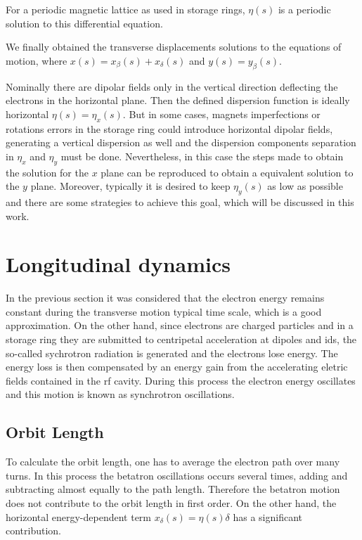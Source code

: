 For a periodic magnetic lattice as used in storage rings, $\eta(s)$ is a periodic solution to this differential equation.

We finally obtained the transverse displacements solutions to the equations of motion, where $x(s) = x_{\beta}(s) + x_{\delta} (s)$ and $y(s) = y_{\beta}(s)$. 

Nominally there are dipolar fields only in the vertical direction deflecting the electrons in the horizontal plane. Then the defined dispersion function is ideally horizontal $\eta(s) = \eta_x(s)$. But in some cases, magnets imperfections or rotations errors in the storage ring could introduce horizontal dipolar fields, generating a vertical dispersion as well and the dispersion components separation in $\eta_x$ and $\eta_y$ must be done. Nevertheless, in this case the steps made to obtain the solution for the $x$ plane can be reproduced to obtain a equivalent solution to the $y$ plane. Moreover, typically it is desired to keep $\eta_y(s)$ as low as possible and there are some strategies to achieve this goal, which will be discussed in this work.
\section{Longitudinal dynamics}\label{longitudinal}
In the previous section it was considered that the electron energy remains constant during the transverse motion typical time scale, which is a good approximation. On the other hand, since electrons are charged particles and in a storage ring they are submitted to centripetal acceleration at dipoles and \gls{id}s, the so-called sychrotron radiation is generated and the electrons lose energy. The energy loss is then compensated by an energy gain from the accelerating eletric fields contained in the \gls{rf} cavity. During this process the electron energy oscillates and this motion is known as synchrotron oscillations.
\subsection{Orbit Length}
To calculate the orbit length, one has to average the electron path over many turns. In this process the betatron oscillations occurs several times, adding and subtracting almost equally to the path length. Therefore the betatron motion does not contribute to the orbit length in first order. On the other hand, the horizontal energy-dependent term $x_{\delta}(s) = \eta(s) \delta$ has a significant contribution. 

